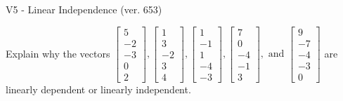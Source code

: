 \begin{exercise}
  \begin{exerciseTitle}V5 - Linear Independence (ver. 653)\end{exerciseTitle}
  \begin{exerciseStatement}
    Explain why the vectors \(\left[\begin{array}{r}
5 \\
-2 \\
-3 \\
0 \\
2
\end{array}\right] , \left[\begin{array}{r}
1 \\
3 \\
-2 \\
3 \\
4
\end{array}\right] , \left[\begin{array}{r}
1 \\
-1 \\
1 \\
-4 \\
-3
\end{array}\right] , \left[\begin{array}{r}
7 \\
0 \\
-4 \\
-1 \\
3
\end{array}\right] , \text{ and } \left[\begin{array}{r}
9 \\
-7 \\
-4 \\
-3 \\
0
\end{array}\right]\) are linearly dependent or linearly independent.	



\end{exerciseStatement}
\end{exercise}
